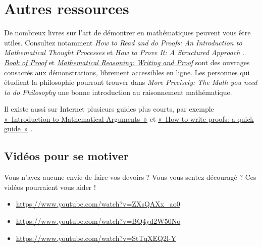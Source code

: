 \documentclass[../../../include/open-logic-section]{subfiles}
\begin{document}

\section{Autres ressources}

De nombreux livres sur l'art de
démontrer en mathématiques peuvent
vous être utiles. Consultez notamment
\emph{How to Read and do Proofs:
An Introduction to Mathematical
Thought Processes} \citep{Solow2013}
et \emph{How to Prove It:
A Structured Approach}
\citep{Velleman2019}.
\href{https://web.cecs.pdx.edu/~antoy/Courses/CS250/open_books/BookOfProof.pdf}{\emph{Book
of Proof}} \citep{Hammack2013}
et
\href{https://scholarworks.gvsu.edu/books/7/}{\emph{Mathematical
Reasoning: Writing and Proof}} \citep{Sandstrum2019}
sont des ouvrages consacrés aux
démonstrations, librement accessibles
en ligne. Les personnes qui étudient
la philosophie pourront trouver
dans \emph{More Precisely:
The Math you need to do Philosophy}
\citep{Steinhart2018}
une bonne introduction au
raisonnement mathématique.

Il existe aussi sur Internet
plusieurs guides plus courts,
par exemple
\href{https://math.berkeley.edu/~hutching/teach/proofs.pdf}{«~Introduction
to Mathematical Arguments~»}
\citep{Hutchings2003}
et
\href{https://eugeniacheng.com/wp-content/uploads/2017/02/cheng-proofguide.pdf}{«~How
to write proofs: a quick guide~»}
\citep{Cheng2004}.

\subsection{Vidéos pour se motiver}

Vous n'avez aucune envie de faire
vos devoirs ? Vous vous sentez
découragé ? Ces vidéos pourraient
vous aider !

\begin{itemize}
\item \url{https://www.youtube.com/watch?v=ZXsQAXx_ao0}
\item \url{https://www.youtube.com/watch?v=BQ4yd2W50No}
\item \url{https://www.youtube.com/watch?v=StTqXEQ2l-Y}
\end{itemize}
\end{document}
